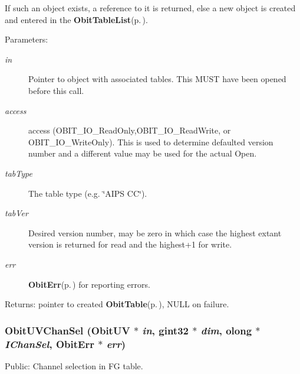 If such an object exists, a reference to it is returned, else a new object is created and entered in the {\bf Obit\-Table\-List}{\rm (p.\,\pageref{structObitTableList})}. \begin{Desc}
\item[Parameters:]
\begin{description}
\item[{\em in}]Pointer to object with associated tables. This MUST have been opened before this call. \item[{\em access}]access (OBIT\_\-IO\_\-Read\-Only,OBIT\_\-IO\_\-Read\-Write, or OBIT\_\-IO\_\-Write\-Only). This is used to determine defaulted version number and a different value may be used for the actual Open. \item[{\em tab\-Type}]The table type (e.g. \char`\"{}AIPS CC\char`\"{}). \item[{\em tab\-Ver}]Desired version number, may be zero in which case the highest extant version is returned for read and the highest+1 for write. \item[{\em err}]{\bf Obit\-Err}{\rm (p.\,\pageref{structObitErr})} for reporting errors. \end{description}
\end{Desc}
\begin{Desc}
\item[Returns:]pointer to created {\bf Obit\-Table}{\rm (p.\,\pageref{structObitTable})}, NULL on failure. \end{Desc}
\subsubsection{ Obit\-UVChan\-Sel ({\bf Obit\-UV} $\ast$ {\em in}, gint32 $\ast$ {\em dim}, {\bf olong} $\ast$ {\em IChan\-Sel}, {\bf Obit\-Err} $\ast$ {\em err})}\label{ObitUV_8c_a41}


Public: Channel selection in FG table. 

